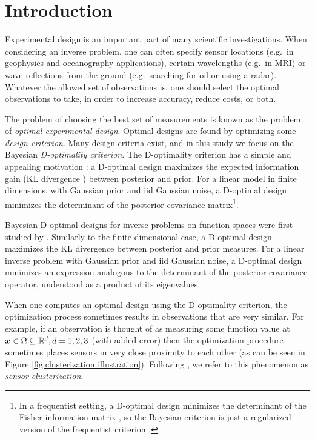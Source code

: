 \section{Introduction}\label{section:OED intro}
Experimental design is an important part of many scientific
investigations. When considering an inverse problem, one can often
specify sensor locations (e.g.\ in geophysics and oceanography
applications), certain wavelengths (e.g.\ in MRI) or wave reflections
from the ground (e.g.\ searching for oil or using a radar). Whatever
the allowed set of observations is, one should select the optimal
observations to take, in order to increase accuracy, reduce costs, or
both.

The problem of choosing the best set of measurements is known as the
problem of \emph{optimal experimental design}. Optimal designs are
found by optimizing some \emph{design criterion}. Many design criteria
exist, and in this study we focus on the Bayesian \emph{D-optimality
criterion}. The D-optimality criterion has a simple and appealing
motivation \cite{Chaloner1995}: a D-optimal design maximizes the
expected information gain (KL divergence \cite{CoverThomas91}) between
posterior and prior. For a linear model in finite dimensions, with
Gaussian prior and iid Gaussian noise, a D-optimal design minimizes
the determinant of the posterior covariance matrix\footnote{In a
frequentist setting, a D-optimal design minimizes the determinant of
the Fisher information matrix \cite[page 16]{Ucinski05}, so the
Bayesian criterion is just a regularized version of the frequentist
criterion \cite{Chaloner1995}.}.

Bayesian D-optimal designs for inverse problems on function spaces
were first studied by \cite{AlexanderianGloorGhattas14,
  AlexanderianPetraStadlerEtAl16,
  AlexanderianPetraStadlerEtAl14}. Similarly to the finite dimensional
case, a D-optimal design maximizes the KL divergence between posterior
and prior measures. For a linear inverse problem with Gaussian prior
and iid Gaussian noise, a D-optimal design minimizes an expression
analogous to the determinant of the posterior covariance operator,
understood as a product of its eigenvalues.

When one computes an optimal design using the D-optimality criterion,
the optimization process sometimes results in observations that are
very similar. For example, if an observation is thought of as
measuring some function value at ${\boldsymbol{x}} \in \Omega \subseteq \mathbb{R}^d,
d=1,2,3$ (with added error) then the optimization procedure sometimes
places sensors in very close proximity to each other (as can be seen
in Figure \ref{fig:clusterization illustration}). Following
\cite{Ucinski05}, we refer to this phenomenon as \emph{sensor
clusterization}.

